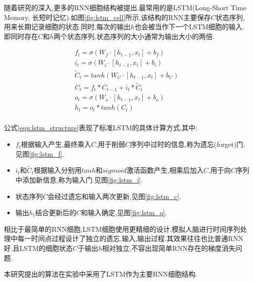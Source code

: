 随着研究的深入,更多的RNN细胞结构被提出.最常用的是LSTM(Long-Short Time Memory, 长短时记忆)\supercite{hochreiter1997long}.如图\ref{fig:lstm_cell}所示,该结构的RNN主要保存$C$状态序列,用来长期记录细胞的状态.同时,每次的输出$h$也会被当作下一个LSTM细胞的输入.即同时存在$C$和$h$两个状态序列,状态序列的大小通常为输出大小的两倍.
\par
\begin{equation} \label{equ:lstm_structure}
    \begin{gathered}
        f_t = \sigma (W_f \cdot [h_{t-1}, x_t] + b_f) \\
        i_t = \sigma (W_i \cdot [h_{t-1}, x_t] + b_i) \\
        \tilde{C}_t = tanh (W_C \cdot [h_{t-1}, x_t] + b_C) \\
        C_t = f_t * C_{t-1}+i_t * \tilde{C}_t \\
        o_t = \sigma (W_o \cdot [h_{t-1}, x_t] + b_o) \\
        h_t = o_t * tanh(C_t) \\
    \end{gathered}
\end{equation}
\par
公式\ref{equ:lstm_structure}表现了标准LSTM的具体计算方式\supercite{Understanding-LSTMs},其中:
\begin{itemize}
    \item $f_t$根据输入产生,最终乘入$C$,用于削弱$C$序列中过时的信息,称为遗忘(forget)门.见图\ref{fig:lstm_f}.
    \item $i_t$和$\tilde{C}_t$根据输入分别用$tanh$和$sigmoid$激活函数产生,相乘后加入$C$,用于向$C$序列中添加新信息,称为输入门.见图\ref{fig:lstm_i}.
    \item 状态序列$C$会经过遗忘和输入两次更新,见图\ref{fig:lstm_c}.
    \item 输出$h_t$结合更新后的$C$和输入确定,见图\ref{fig:lstm_o}.
\end{itemize}
相比于最简单的RNN细胞,LSTM细胞使用更精细的设计,模拟人脑进行时间序列处理中每一时间点过程设计了独立的遗忘,输入,输出过程.其效果往往也比普通RNN好.且LSTM的细胞状态$C$于输出$h$相对独立,不容出现简单RNN存在的梯度消失问题\supercite{hochreiter1997long}.
\par
本研究提出的算法在实验中采用了LSTM作为主要RNN细胞结构.

